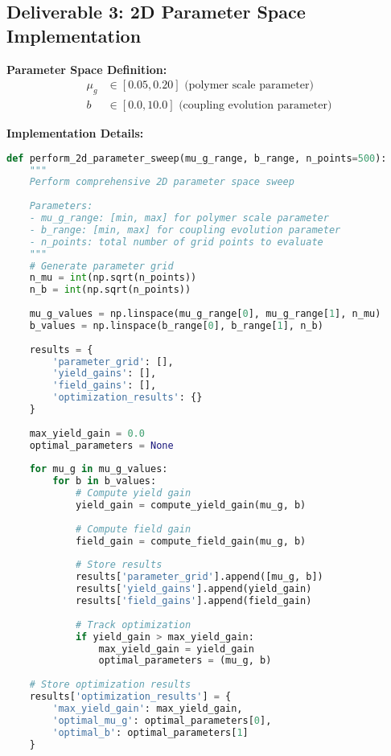 \documentclass[11pt]{article}
\begin{document}
\subsection{Deliverable 3: 2D Parameter Space Implementation}

\textbf{Parameter Space Definition:}
\begin{align}
\mu_g &\in [0.05, 0.20] \text{ (polymer scale parameter)} \\
b &\in [0.0, 10.0] \text{ (coupling evolution parameter)}
\end{align}

\textbf{Implementation Details:}
\begin{lstlisting}[language=Python, caption=2D Parameter Space Sweep]
def perform_2d_parameter_sweep(mu_g_range, b_range, n_points=500):
    """
    Perform comprehensive 2D parameter space sweep
    
    Parameters:
    - mu_g_range: [min, max] for polymer scale parameter
    - b_range: [min, max] for coupling evolution parameter
    - n_points: total number of grid points to evaluate
    """
    # Generate parameter grid
    n_mu = int(np.sqrt(n_points))
    n_b = int(np.sqrt(n_points))
    
    mu_g_values = np.linspace(mu_g_range[0], mu_g_range[1], n_mu)
    b_values = np.linspace(b_range[0], b_range[1], n_b)
    
    results = {
        'parameter_grid': [],
        'yield_gains': [],
        'field_gains': [],
        'optimization_results': {}
    }
    
    max_yield_gain = 0.0
    optimal_parameters = None
    
    for mu_g in mu_g_values:
        for b in b_values:
            # Compute yield gain
            yield_gain = compute_yield_gain(mu_g, b)
            
            # Compute field gain
            field_gain = compute_field_gain(mu_g, b)
            
            # Store results
            results['parameter_grid'].append([mu_g, b])
            results['yield_gains'].append(yield_gain)
            results['field_gains'].append(field_gain)
            
            # Track optimization
            if yield_gain > max_yield_gain:
                max_yield_gain = yield_gain
                optimal_parameters = (mu_g, b)
    
    # Store optimization results
    results['optimization_results'] = {
        'max_yield_gain': max_yield_gain,
        'optimal_mu_g': optimal_parameters[0],
        'optimal_b': optimal_parameters[1]
    }
    

\end{lstlisting}
\end{document}
